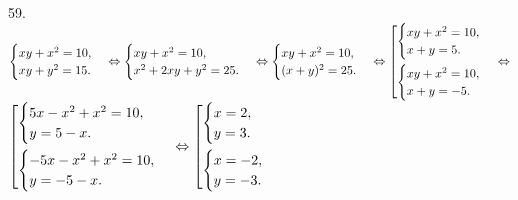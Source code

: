 59. $\begin{cases}
xy+x^2=10,\\
xy+y^2=15.\end{cases}\Leftrightarrow\begin{cases}
xy+x^2=10,\\
x^2+2xy+y^2=25.\end{cases}\Leftrightarrow\begin{cases}
xy+x^2=10,\\
(x+y)^2=25.\end{cases}\Leftrightarrow\left[
      \begin{gathered} \begin{cases}xy+x^2=10,\\ x+y=5.\end{cases}\hfill\\
      \begin{cases}xy+x^2=10,\\ x+y=-5.\end{cases}\hfill \end{gathered}\right.
\Leftrightarrow$\\$\left[
      \begin{gathered} \begin{cases}5x-x^2+x^2=10,\\ y=5-x.\end{cases}\hfill\\
      \begin{cases}-5x-x^2+x^2=10,\\ y=-5-x.\end{cases}\hfill \end{gathered}\right.
\Leftrightarrow\left[
      \begin{gathered} \begin{cases}x=2,\\ y=3.\end{cases}\hfill\\
      \begin{cases}x=-2,\\ y=-3.\end{cases}\hfill \end{gathered}\right.$\\
